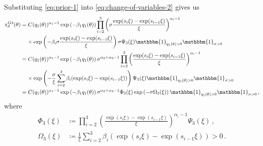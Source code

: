 \documentclass{article}
\begin{document}
%
Substituting \eqref{eq:prior-1} into \eqref{eq:change-of-variables-2}
gives us
\begin{align}
	\pi^{\text{G3}}_\theta(\theta) 
		&=C (q_1(\theta))^{\alpha_1 - 1} \exp\left(-\beta_1 q_1(\theta)\right)
		\prod^{3}_{i=2} \left(\sigma \frac{\exp(s_{i} \xi)
		- \exp(s_{i - 1}\xi)}{\xi}\right) ^ {\alpha_i - 1} \nonumber \\
	&\ \phantom{=} \times \exp\left(-\beta_i \sigma \frac{\exp(s_{i} \xi)
		- \exp(s_{i - 1}\xi)}{\xi}\right) \sigma \Psi_3(\xi)
		\mathbbm{1}_{{q_1(\theta)} > 0} \mathbbm{1}_{\sigma > 0} \nonumber \\
	&=C (q_1(\theta)) ^ {\alpha_1 - 1} \exp\left(-\beta_1 q_1(\theta)\right)
		\sigma ^ {\alpha_2 + \alpha_3 - 1} \prod^{3}_{i=2}
		\left(\frac{\exp(s_{i} \xi) - \exp(s_{i - 1}\xi)}{\xi}\right)
		^ {\alpha_i-1} \nonumber \\
	&\ \phantom{=} \times \exp\left(-\frac{\sigma}{\xi}
		\sum_{i=2}^3 \beta_i (\exp(s_{i} \xi) - \exp(s_{i-1} \xi))\right)
		\Psi_3(\xi) \mathbbm{1}_{{q_1(\theta)} > 0}\mathbbm{1}_{\sigma > 0}
		\nonumber \\
	&=C (q_1(\theta)) ^ {\alpha_1 - 1} \exp\left(-\beta_1 q_1(\theta)\right)
		\sigma ^ {\alpha_2 + \alpha_3 - 1} \Phi_3(\xi)
		\exp\left(-\sigma \Omega_3(\xi)\right) \mathbbm{1}_{{q_1(\theta)} > 0}
		\mathbbm{1}_{\sigma > 0} \,,
	\label{eq:g3-theta}
\end{align}
%
where
%
\begin{align*}
	\Phi_3(\xi) &\coloneqq \prod^{3}_{i=2} \left(\frac{\exp(s_{i} \xi)
		- \exp(s_{i - 1} \xi)}{\xi}\right) ^ {\alpha_i - 1} \Psi_3(\xi) \,,\\
	\Omega_3(\xi) &\coloneqq \frac{1}{\xi}
		\sum_{i=2}^3 \beta_i(\exp(s_{i} \xi) - \exp(s_{i - 1} \xi)) > 0 \,.
\end{align*}
%
\end{document}
